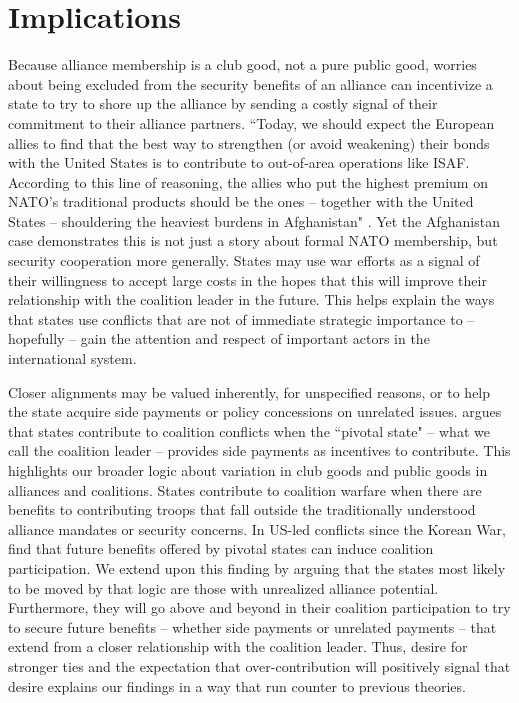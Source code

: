 \documentclass[12pt,letterpaper]{article}
\begin{document}
\section{Implications}
	Because alliance membership is a club good, not a pure public good, worries about being excluded from the security benefits of an alliance can incentivize a state to try to shore up the alliance by sending a costly signal of their commitment to their alliance partners. ``Today, we should expect the European allies to find that the best way to strengthen (or avoid weakening) their bonds with the United States is to contribute to out-of-area operations like ISAF. According to this line of reasoning, the allies who put the highest premium on NATO’s traditional products should be the ones – together with the United States – shouldering the heaviest burdens in Afghanistan" \citep[331]{ringsmose_natoburdensharingredux_2010}. Yet the Afghanistan case demonstrates this is not just a story about formal NATO membership, but security cooperation more generally. States may use war efforts as a signal of their willingness to accept large costs in the hopes that this will improve their relationship with the coalition leader in the future. This helps explain the ways that states use conflicts that are not of immediate strategic importance to -- hopefully -- gain the attention and respect of important actors in the international system.

	Closer alignments may be valued inherently, for unspecified reasons, or to help the state acquire side payments or policy concessions on unrelated issues. \citet{henke_buyingalliespayment_2019} argues that states contribute to coalition conflicts when the ``pivotal state" -- what we call the coalition leader -- provides side payments as incentives to contribute. This highlights our broader logic about variation in club goods and public goods in alliances and coalitions. States contribute to coalition warfare when there are benefits to contributing troops that fall outside the traditionally understood alliance mandates or security concerns. In US-led conflicts since the Korean War, \citet{henke_buyingalliespayment_2019} find that future benefits offered by pivotal states can induce coalition participation. We extend upon this finding by arguing that the states most likely to be moved by that logic are those with unrealized alliance potential. Furthermore, they will go above and beyond in their coalition participation to try to secure future benefits -- whether side payments or unrelated payments -- that extend from a closer relationship with the coalition leader. Thus, desire for stronger ties and the expectation that over-contribution will positively signal that desire explains our findings in a way that run counter to previous theories.
	
\end{document}
